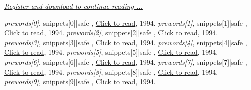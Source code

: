 \documentclass{article}
\begin{document}
\vspace{20pt}

\noindent
{\color{blue}
\emph{
\large{
\underline{
\href{http://www.seepdf.com/download/{{ title|title }} }{Register and download to continue reading ...}
}}}}

\clearpage %

\begin{thebibliography}{99}

\emph{ {{prewords[0]}}}, { {{snippets[0]|safe }} }, \href{http://www.google.com}{Click to read}, 1994.
\emph{
{{prewords[1]}}}, { {{snippets[1]|safe }} }, \href{http://www.google.com}{Click to read}, 1994.
\emph{
{{prewords[2]}}}, { {{snippets[2]|safe }} }, \href{http://www.google.com}{Click to read}, 1994.
\emph{
{{prewords[3]}}}, { {{snippets[3]|safe }} }, \href{http://www.google.com}{Click to read}, 1994.
\emph{
{{prewords[4]}}}, { {{snippets[4]|safe }} }, \href{http://www.google.com}{Click to read}, 1994.
\emph{
{{prewords[5]}}}, { {{snippets[5]|safe }} }, \href{http://www.google.com}{Click to read}, 1994.
\emph{
{{prewords[6]}}}, { {{snippets[6]|safe }} }, \href{http://www.google.com}{Click to read}, 1994.
\emph{
{{prewords[7]}}}, { {{snippets[7]|safe }} }, \href{http://www.google.com}{Click to read}, 1994.
\emph{
{{prewords[8]}}}, { {{snippets[8]|safe }} }, \href{http://www.google.com}{Click to read}, 1994.
\emph{
{{prewords[9]}}}, { {{snippets[9]|safe }} }, \href{http://www.google.com}{Click to read}, 1994.

\end{thebibliography}
\end{document}
